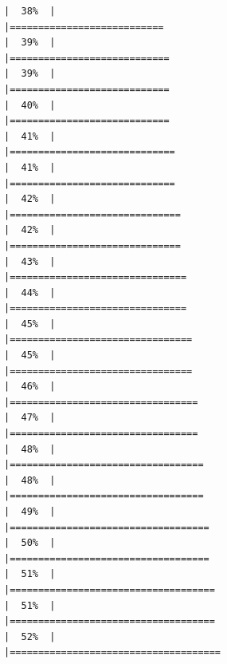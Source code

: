 \documentclass[
  english,
  man,a4paper,mask,floatsintext]{apa6}
\begin{document}
\begin{verbatim}
|  38%  |                                                                              |===========================                                           |  39%  |                                                                              |============================                                          |  39%  |                                                                              |============================                                          |  40%  |                                                                              |============================                                          |  41%  |                                                                              |=============================                                         |  41%  |                                                                              |=============================                                         |  42%  |                                                                              |==============================                                        |  42%  |                                                                              |==============================                                        |  43%  |                                                                              |===============================                                       |  44%  |                                                                              |===============================                                       |  45%  |                                                                              |================================                                      |  45%  |                                                                              |================================                                      |  46%  |                                                                              |=================================                                     |  47%  |                                                                              |=================================                                     |  48%  |                                                                              |==================================                                    |  48%  |                                                                              |==================================                                    |  49%  |                                                                              |===================================                                   |  50%  |                                                                              |===================================                                   |  51%  |                                                                              |====================================                                  |  51%  |                                                                              |====================================                                  |  52%  |                                                                              |=====================================                                 
\end{verbatim}
\end{document}
